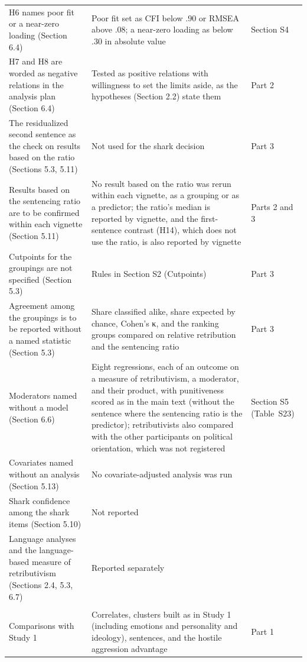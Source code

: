 \begin{longtable}{@{}>{\raggedright\arraybackslash}p{2.483in}>{\raggedright\arraybackslash}p{2.181in}>{\raggedright\arraybackslash}p{1.503in}@{}}
H6 names poor fit or a near-zero loading (Section 6.4) & Poor fit set as CFI below .90 or RMSEA above .08; a near-zero loading as below .30 in absolute value & Section S4 \\
H7 and H8 are worded as negative relations in the analysis plan (Section 6.4) & Tested as positive relations with willingness to set the limits aside, as the hypotheses (Section 2.2) state them & Part 2 \\
The residualized second sentence as the check on results based on the ratio (Sections 5.3, 5.11) & Not used for the shark decision & Part 3 \\
Results based on the sentencing ratio are to be confirmed within each vignette (Section 5.11) & No result based on the ratio was rerun within each vignette, as a grouping or as a predictor; the ratio's median is reported by vignette, and the first-sentence contrast (H14), which does not use the ratio, is also reported by vignette & Parts 2 and 3 \\
Cutpoints for the groupings are not specified (Section 5.3) & Rules in Section S2 (Cutpoints) & Part 3 \\
Agreement among the groupings is to be reported without a named statistic (Section 5.3) & Share classified alike, share expected by chance, Cohen's κ, and the ranking groups compared on relative retribution and the sentencing ratio & Part 3 \\
Moderators named without a model (Section 6.6) & Eight regressions, each of an outcome on a measure of retributivism, a moderator, and their product, with punitiveness scored as in the main text (without the sentence where the sentencing ratio is the predictor); retributivists also compared with the other participants on political orientation, which was not registered & Section S5 (Table~S23) \\
Covariates named without an analysis (Section 5.13) & No covariate-adjusted analysis was run &  \\
Shark confidence among the shark items (Section 5.10) & Not reported &  \\
Language analyses and the language-based measure of retributivism (Sections 2.4, 5.3, 6.7) & Reported separately &  \\
\multicolumn{3}{@{}l@{}}{\emph{Analyses added after the registration}} \\*
Comparisons with Study 1 & Correlates, clusters built as in Study 1 (including emotions and personality and ideology), sentences, and the hostile aggression advantage & Part 1 \\

\end{longtable}
